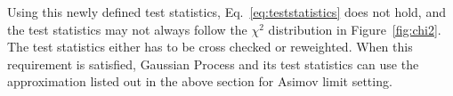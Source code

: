 Using this newly defined test statistics, Eq.~\ref{eq:teststatistics} does not hold, and the test statistics may not always follow the $\chi^{2}$ distribution in Figure~\ref{fig:chi2}. The test statistics either has to be cross checked or reweighted. When this requirement is satisfied, Gaussian Process and its test statistics can use the approximation listed out in the above section for Asimov limit setting.




